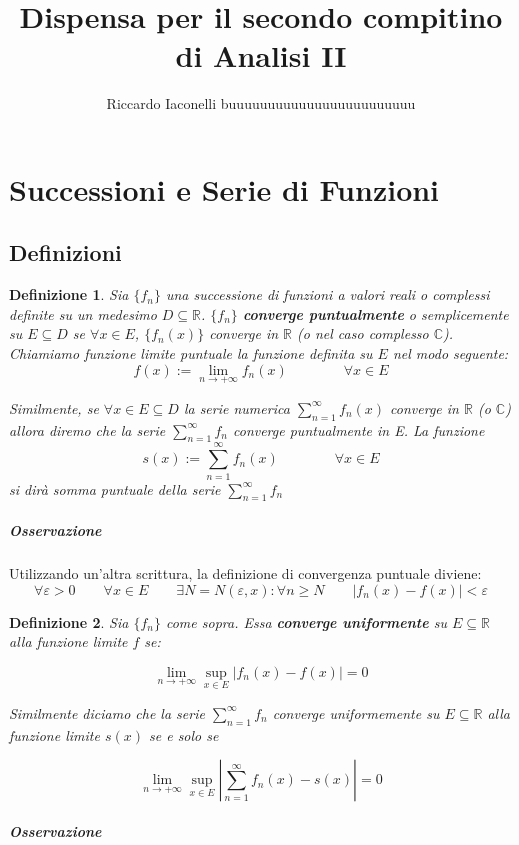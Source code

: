 \documentclass[a4paper,12pt]{article}
\newtheorem{defi}{Definizione}
\begin{document}
\begin{titlepage}
\title{Dispensa per il secondo compitino di Analisi II}
\author{Riccardo Iaconelli buuuuuuuuuuuuuuuuuuuuuuuu}
\maketitle
\end{titlepage}

\begin{titlepage}
\tableofcontents
\end{titlepage}

\section{Successioni e Serie di Funzioni}
\subsection{Definizioni}
\begin{defi}
Sia $\{ f_n\} $  una successione di funzioni a valori reali o complessi definite su un medesimo $D \subseteq \mathbb{R}$.
 $\{ f_n\} $ \textbf{converge puntualmente} o semplicemente su $ E \subseteq D $ se $\forall x \in E$, $\{f_n(x)\}$ converge in $\mathbb{R}$ (o nel caso complesso $\mathbb{C}$). Chiamiamo funzione limite puntuale la funzione definita su $E$ nel modo seguente: 
 $$f(x):=\lim_{n\to+\infty} f_n(x) \qquad \qquad \forall x \in E $$

Similmente, se $\forall x \in E \subseteq D$ la serie numerica $\sum_{n=1}^{\infty} f_n(x)$ converge in $\mathbb{R}$ (o $\mathbb{C}$)  allora diremo che la serie  $\sum_{n=1}^{\infty} f_n$ converge puntualmente in E. La funzione
\begin{displaymath}
s(x):= \sum_{n=1}^{\infty} f_n(x) \qquad \qquad \forall x \in E
\end{displaymath}
si dirà somma puntuale della serie $\sum_{n=1}^{\infty} f_n$
\end{defi}


\subparagraph*{Osservazione}
Utilizzando un'altra scrittura, la definizione di convergenza puntuale diviene:
 $$\forall \varepsilon>0\qquad \forall x \in E\qquad\exists N=N(\varepsilon, x): \forall n \geq N\qquad |f_n(x) - f(x)| < \varepsilon$$ 
\begin{defi}
Sia $\{ f_n\} $ come sopra. Essa \textbf{ converge uniformente} su $E \subseteq \mathbb{R} $ alla funzione limite $f$ se:
 
$$ \lim_{n\to+\infty} \displaystyle \sup_{x \in E} |f_n\left(x\right)-f\left(x\right)| = 0$$


Similmente diciamo che la serie $\sum_{n=1}^{\infty} f_n$ converge uniformemente su $E \subseteq \mathbb{R} $ alla funzione limite $s(x)$ se e solo se

$$ \lim_{n\to+\infty}  \sup_{x \in E} \displaystyle \left|\sum_{n=1}^{\infty} f_n(x)-s(x)\right| = 0 $$

\end{defi}
\subparagraph*{Osservazione}
 
\end{document}
